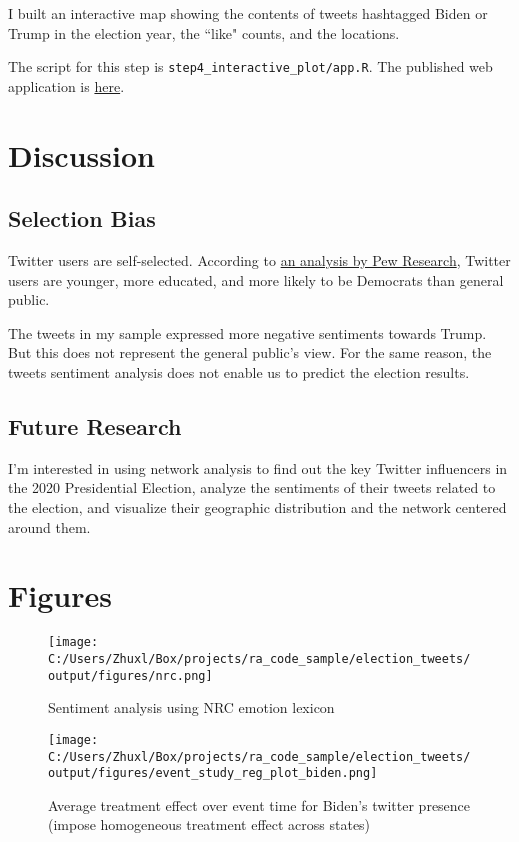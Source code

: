 \documentclass{article}
\begin{document}
I built an interactive map showing the contents of tweets hashtagged Biden or Trump in the election year, the ``like" counts, and the locations. 

The script for this step is \verb|step4_interactive_plot/app.R|. The published web application is \href{https://celia-zhu.shinyapps.io/2020_election_tweets_map/}{here}.

\section{Discussion}

\subsection{Selection Bias}
Twitter users are self-selected. According to \href{https://www.pewresearch.org/internet/2019/04/24/sizing-up-twitter-users/}{an analysis by Pew Research}, Twitter users are younger, more educated, and more likely to be Democrats than general public. 

The tweets in my sample expressed more negative sentiments towards Trump. But this does not represent the general public's view. For the same reason, the tweets sentiment analysis does not enable us to predict the election results. 

\subsection{Future Research}
I'm interested in using network analysis to find out the key Twitter influencers in the 2020 Presidential Election, analyze the sentiments of their tweets related to the election, and visualize their geographic distribution and the network centered around them. 

\pagebreak
\section{Figures}
	
\begin{figure}[h] 
	\begin{center}
		\texttt{[image: C:/Users/Zhuxl/Box/projects/ra\_code\_sample/election\_tweets/output/figures/nrc.png]}
		\caption{Sentiment analysis using NRC emotion lexicon} \label{fig:0}
	\end{center}
\end{figure}

\begin{figure}[h]
	\begin{center}		
		\texttt{[image: C:/Users/Zhuxl/Box/projects/ra\_code\_sample/election\_tweets/output/figures/event\_study\_reg\_plot\_biden.png]}
		\caption{Average treatment effect over event time for Biden's twitter presence (impose homogeneous treatment effect across states)}\label{fig:1}
	\end{center}
\end{figure}
\end{document}
